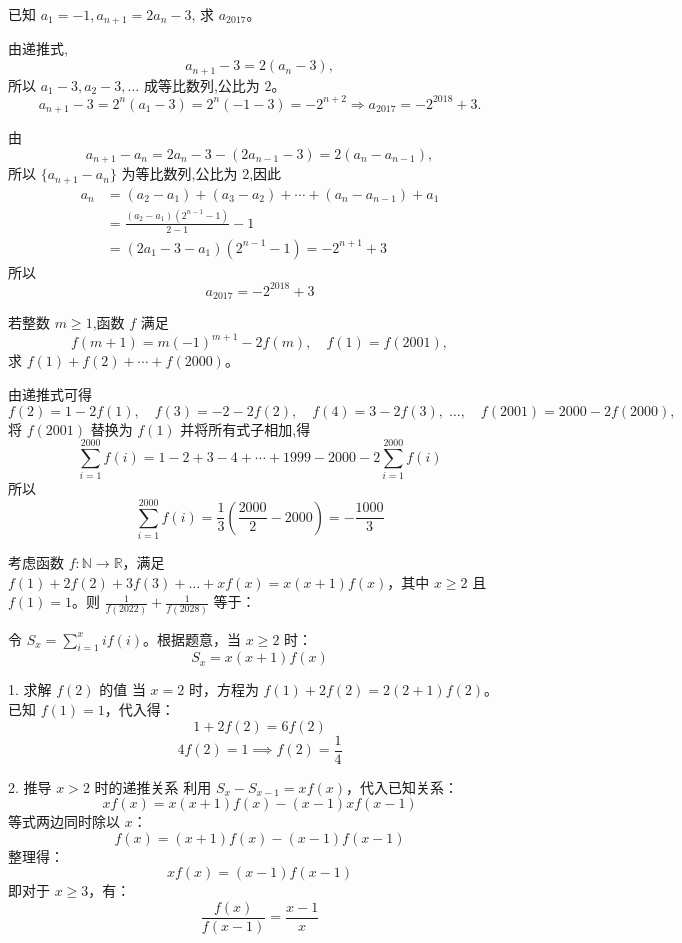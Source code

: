 \begin{questions}
    \question 已知 $a_1=-1,a_{n+1}=2a_n-3$, 求 $a_{2017}$。
    \begin{solution}
        由递推式,
        \[
        a_{n+1}-3 = 2(a_n-3),
        \]
        所以 $a_1-3,a_2-3,\dots$ 成等比数列,公比为 $2$。
        \[
        a_{n+1}-3 = 2^n(a_1-3) = 2^n(-1-3) = -2^{n+2} \Rightarrow a_{2017} = -2^{2018}+3.
        \]
    \end{solution}
    \begin{solution}
        由
        \[
        a_{n+1}-a_n =2a_n-3-(2a_{n-1}-3)= 2(a_n-a_{n-1}),
        \]
        所以 $\{a_{n+1}-a_n\}$ 为等比数列,公比为 $2$,因此
        \begin{align*}
        a_n &= (a_2-a_1)+(a_3-a_2)+\cdots+(a_n-a_{n-1})+a_1 \\
        &= \frac{(a_2-a_1)(2^{n-1}-1)}{2-1}-1 \\ 
        &= (2a_1-3-a_1)(2^{n-1}-1) =-2^{n+1}+3
        \end{align*}
        所以
        \[
        a_{2017}=-2^{2018}+3
        \]
    \end{solution}

    \question 若整数 $m\ge 1$,函数 $f$ 满足
    \[
    f(m+1)=m(-1)^{m+1}-2f(m), \quad f(1)=f(2001),
    \]
    求 $f(1)+f(2)+\cdots+f(2000)$。
    \begin{solution}
        由递推式可得
        \[
        f(2)=1-2f(1),\quad f(3)=-2-2f(2),\quad f(4)=3-2f(3),\;\ldots,\quad f(2001)=2000-2f(2000),
        \]
        将 $f(2001)$ 替换为 $f(1)$ 并将所有式子相加,得
        \[
        \sum_{i=1}^{2000} f(i)=1-2+3-4+\cdots+1999-2000-2\sum_{i=1}^{2000} f(i)
        \]
        所以
        \[
        \sum_{i=1}^{2000} f(i)=\frac{1}{3}\left(\frac{2000}{2}-2000\right)=-\frac{1000}{3}
        \]
    \end{solution}

    \question 
考虑函数 $f : \mathbb{N} \to \mathbb{R}$，满足 $f(1) + 2f(2) + 3f(3) + \dots + xf(x) = x(x + 1)f(x)$，其中 $x \geq 2$ 且 $f(1) = 1$。则 $\frac{1}{f(2022)} + \frac{1}{f(2028)}$ 等于：

\begin{solution}
令 $S_x = \sum_{i=1}^{x} i f(i)$。根据题意，当 $x \geq 2$ 时：
\[ S_x = x(x+1)f(x) \]

1. 求解 $f(2)$ 的值
当 $x=2$ 时，方程为 $f(1) + 2f(2) = 2(2+1)f(2)$。
已知 $f(1) = 1$，代入得：
\[ 1 + 2f(2) = 6f(2) \]
\[ 4f(2) = 1 \implies f(2) = \frac{1}{4} \]

2. 推导 $x > 2$ 时的递推关系
利用 $S_x - S_{x-1} = xf(x)$，代入已知关系：
\[ xf(x) = x(x+1)f(x) - (x-1)xf(x-1) \]
等式两边同时除以 $x$：
\[ f(x) = (x+1)f(x) - (x-1)f(x-1) \]
整理得：
\[ x f(x) = (x-1) f(x-1) \]
即对于 $x \geq 3$，有：
\[ \frac{f(x)}{f(x-1)} = \frac{x-1}{x} \]


\end{solution}
\end{questions}
